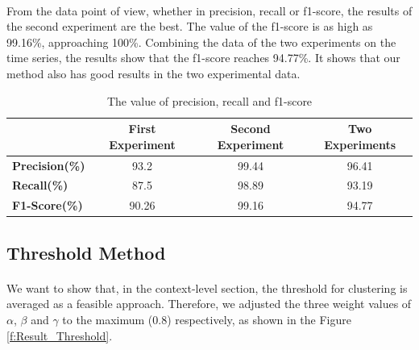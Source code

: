 \documentclass[a4paper,12pt]{report}
\begin{document}
\paragraph{}
From the data point of view, whether in precision, recall or f1-score, the results of the second experiment are the best. The value of the f1-score is as high as 99.16\%, approaching 100\%. Combining the data of the two experiments on the time series, the results show that the f1-score reaches 94.77\%. It shows that our method also has good results in the two experimental data.
\begin{table}[btph]
\begin{center}
\caption{The value of precision, recall and f1-score}
\label{t:PrecisionRecallF1Score}
\begin{tabular}{|l|c|c|c|}
\hline
 & First Experiment & Second Experiment & Two Experiments \\ \hline
\textbf{Precision(\%)} & 93.2 & 99.44 & 96.41 \\ \hline
\textbf{Recall(\%)} & 87.5 & 98.89 & 93.19 \\ \hline
\textbf{F1-Score(\%)} & 90.26 & 99.16 & 94.77 \\ \hline
\end{tabular}
\end{center}
\end{table}
\clearpage
\subsection{Threshold Method}
\paragraph{}
We want to show that, in the context-level section, the threshold for clustering is averaged as a feasible approach. Therefore, we adjusted the three weight values of $\alpha$, $\beta$ and $\gamma$ to the maximum (0.8) respectively, as shown in the Figure \ref{f:Result_Threshold}.
\end{document}
